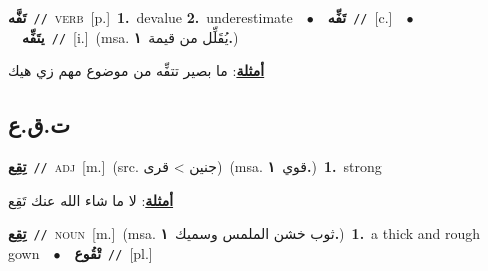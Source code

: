 \documentclass[10pt,a4paper,twoside]{article} %
\begin{document}
\begin{multicols}{2}
{\setlength\topsep{0pt}\textbf{\foreignlanguage{arabic}{تَفَّه}}\ {\color{gray}\texttt{//}\color{black}}\ \textsc{verb}\ [p.]\ \textbf{1.}~devalue  \textbf{2.}~underestimate\ \ $\bullet$\ \ \setlength\topsep{0pt}\textbf{\foreignlanguage{arabic}{تَفِّه}}\ {\color{gray}\texttt{//}\color{black}}\ [c.]\ \ $\bullet$\ \ \setlength\topsep{0pt}\textbf{\foreignlanguage{arabic}{يتَفِّه}}\ {\color{gray}\texttt{//}\color{black}}\ [i.]\ \color{gray}(msa. \foreignlanguage{arabic}{يُقَلِّل من قيمة}~\foreignlanguage{arabic}{\textbf{١.}})\color{black}\  \begin{flushright}\color{gray}\foreignlanguage{arabic}{\textbf{\underline{\foreignlanguage{arabic}{أمثلة}}}: ما بصير تتفِّه من موضوع مهم زي هيك}\end{flushright}\color{black}} \vspace{2mm}

\vspace{-3mm}
\subsection*{\color{blue}\foreignlanguage{arabic}{ت.ق.ع}\color{blue}{ (ntws)}} 

{\setlength\topsep{0pt}\textbf{\foreignlanguage{arabic}{تِقِع}}\ {\color{gray}\texttt{//}\color{black}}\ \textsc{adj}\ [m.]\ (src. \color{gray}\foreignlanguage{arabic}{جنين > قرى}\color{black})\ \color{gray}(msa. \foreignlanguage{arabic}{قوي}~\foreignlanguage{arabic}{\textbf{١.}})\color{black}\ \textbf{1.}~strong\  \begin{flushright}\color{gray}\foreignlanguage{arabic}{\textbf{\underline{\foreignlanguage{arabic}{أمثلة}}}: لا ما شاء الله عنك تَقِع}\end{flushright}\color{black}} \vspace{2mm}

{\setlength\topsep{0pt}\textbf{\foreignlanguage{arabic}{تِقِع}}\ {\color{gray}\texttt{//}\color{black}}\ \textsc{noun}\ [m.]\ \color{gray}(msa. \foreignlanguage{arabic}{ثوب خشن الملمس وسميك}~\foreignlanguage{arabic}{\textbf{١.}})\color{black}\ \textbf{1.}~a thick and rough gown\ \ $\bullet$\ \ \setlength\topsep{0pt}\textbf{\foreignlanguage{arabic}{تْقُوع}}\ {\color{gray}\texttt{//}\color{black}}\ [pl.]\ } \vspace{2mm}


\end{multicols}
\end{document}
